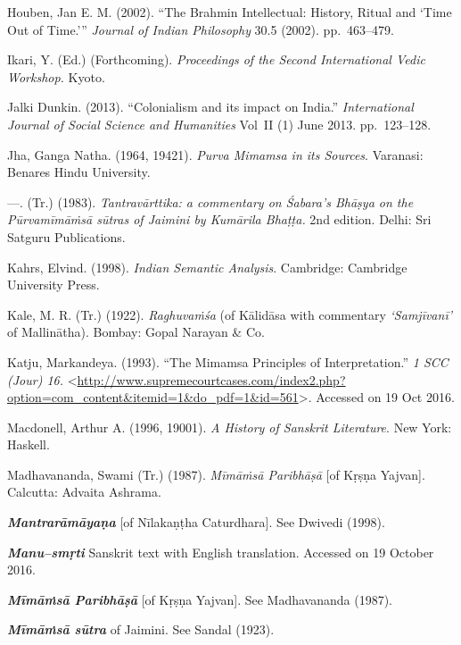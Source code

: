 \begin{thebibliography}{99}
  Houben, Jan E. M. (2002). “The Brahmin Intellectual: History, Ritual and ‘Time Out of Time.’” \textit{Journal of Indian Philosophy} 30.5 (2002). pp.~463–479.

  Ikari, Y. (Ed.) (Forthcoming). \textit{Proceedings of the Second International Vedic Workshop.} Kyoto.

  Jalki Dunkin. (2013). “Colonialism and its impact on India.” \textit{International Journal of Social Science and Humanities} Vol~II (1) June 2013. pp.~123–128.

  Jha, Ganga Natha. (1964, 19421). \textit{Purva Mimamsa in its Sources}. Varanasi: Benares Hindu University.

  —. (Tr.) (1983). \textit{Tantravārttika: a commentary on Śabara's Bhāṣya on the Pūrvamīmāṁsā sūtras of Jaimini by Kumārila Bhaṭṭa.} 2nd edition. Delhi: Sri Satguru Publications.

  Kahrs, Elvind. (1998). \textit{Indian Semantic Analysis}. Cambridge: Cambridge University Press.

  Kale, M. R. (Tr.) (1922). \textit{Raghuvaṁśa} (of Kālidāsa with commentary \textit{‘Samjīvanī’} of Mallinātha). Bombay: Gopal Narayan \& Co.

  Katju, Markandeya. (1993). “The Mimamsa Principles of Interpretation.” \textit{1 SCC (Jour) 16.} \textless  \url{http://www.supremecourtcases.com/index2.php?option=com_content&itemid=1&do_pdf=1&id=561}\textgreater . Accessed on 19 Oct 2016.

  Macdonell, Arthur A. (1996, 19001). \textit{A History of Sanskrit Literature}. New York: Haskell.  

  Madhavananda, Swami (Tr.) (1987). \textit{Mīmāṁsā Paribhāṣā} [of Kṛṣṇa Yajvan]. Calcutta: Advaita Ashrama.

  \textbf{\textit{Mantrarāmāyaṇa}} [of Nīlakaṇṭha Caturdhara]. See Dwivedi (1998).

  \textbf{\textit{Manu–smṛti}} Sanskrit text with English translation. Accessed on 19 October 2016.

  \textbf{\textit{Mīmāṁsā Paribhāṣā}} [of Kṛṣṇa Yajvan]. See Madhavananda (1987).

  \textbf{\textit{Mīmāṁsā sūtra}} of Jaimini. See Sandal (1923).


\end{thebibliography}
